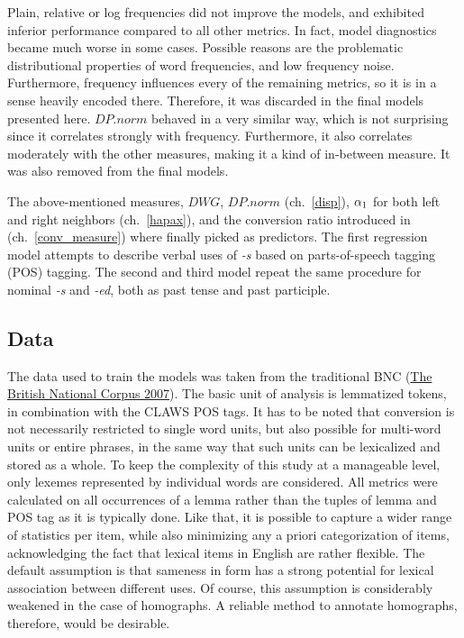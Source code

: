 \documentclass[
]{article}
\begin{document}
Plain, relative or log frequencies did not improve the models, and
exhibited inferior performance compared to all other metrics. In fact,
model diagnostics became much worse in some cases. Possible reasons are
the problematic distributional properties of word frequencies, and low
frequency noise. Furthermore, frequency influences every of the
remaining metrics, so it is in a sense heavily encoded there. Therefore,
it was discarded in the final models presented here. \(DP.norm\) behaved
in a very similar way, which is not surprising since it correlates
strongly with frequency. Furthermore, it also correlates moderately with
the other measures, making it a kind of in-between measure. It was also
removed from the final models.

The above-mentioned measures, \(DWG\), \(DP.norm\) (ch.~\ref{disp}),
\(\alpha\textsubscript{1}\) for both left and right neighbors
(ch.~\ref{hapax}), and the conversion ratio introduced in
(ch.~\ref{conv_measure}) where finally picked as predictors. The first
regression model attempts to describe verbal uses of \emph{-s} based on
parts-of-speech tagging (POS) tagging. The second and third model repeat
the same procedure for nominal \emph{-s} and \emph{-ed}, both as past
tense and past participle.

\hypertarget{data}{%
\subsection{Data}\label{data}}

The data used to train the models was taken from the traditional BNC
(\protect\hyperlink{ref-bnc}{The British National Corpus 2007}). The
basic unit of analysis is lemmatized tokens, in combination with the
CLAWS POS tags. It has to be noted that conversion is not necessarily
restricted to single word units, but also possible for multi-word units
or entire phrases, in the same way that such units can be lexicalized
and stored as a whole. To keep the complexity of this study at a
manageable level, only lexemes represented by individual words are
considered. All metrics were calculated on all occurrences of a lemma
rather than the tuples of lemma and POS tag as it is typically done.
Like that, it is possible to capture a wider range of statistics per
item, while also minimizing any a priori categorization of items,
acknowledging the fact that lexical items in English are rather
flexible. The default assumption is that sameness in form has a strong
potential for lexical association between different uses. Of course,
this assumption is considerably weakened in the case of homographs. A
reliable method to annotate homographs, therefore, would be desirable.
\end{document}
